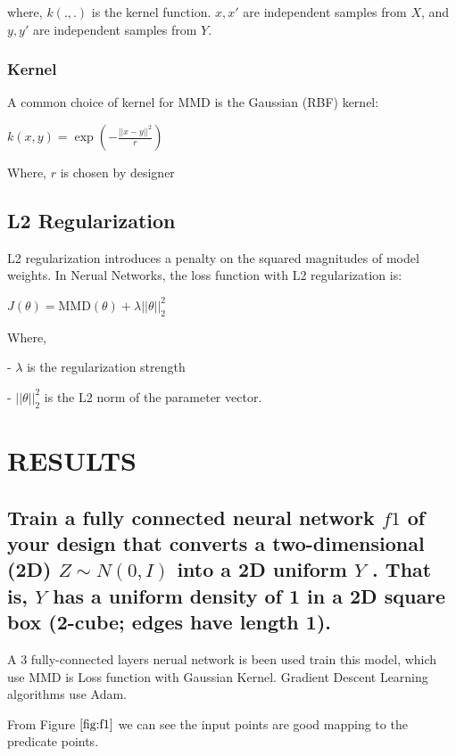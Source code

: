 \documentclass{article}
\begin{document}
where, $k(.,.)$ is the kernel function. 
$x, x'$ are independent samples from $X$,
and $y, y'$ are independent samples from $Y$.

\subsubsection{Kernel}
\label{sssec:kernel}

A common choice of kernel for MMD is the Gaussian (RBF) kernel:

$ k(x, y) = \exp\left(-\frac{||x - y||^2}{r}\right) $

Where, $r$ is chosen by designer



\subsection{L2 Regularization}
\label{ssec:l2regularization}

L2 regularization introduces a penalty on the squared magnitudes of model weights. 
In Nerual Networks, the loss function with L2 regularization is:

$ J(\theta) = \text{MMD}(\theta) + \lambda ||\theta||_2^2 $

Where,

- $\lambda$ is the regularization strength

- $||\theta||_2^2$ is the L2 norm of the parameter vector.

\section{RESULTS}
\label{sec:results}

\subsection{Train a fully connected neural network $f1$ of your design that converts a
two-dimensional (2D) $Z \sim N (0, I)$ into a 2D uniform $Y$ . That is, $Y$ has
a uniform density of 1 in a 2D square box (2-cube; edges have length 1).}
\label{ssec:q1}

A 3 fully-connected layers nerual network is been used train this model, 
which use MMD is Loss function with Gaussian Kernel. 
Gradient Descent Learning algorithms use Adam.

From Figure $\ref{fig:f1}$ we can see the input points are good mapping to the predicate points.
\end{document}
